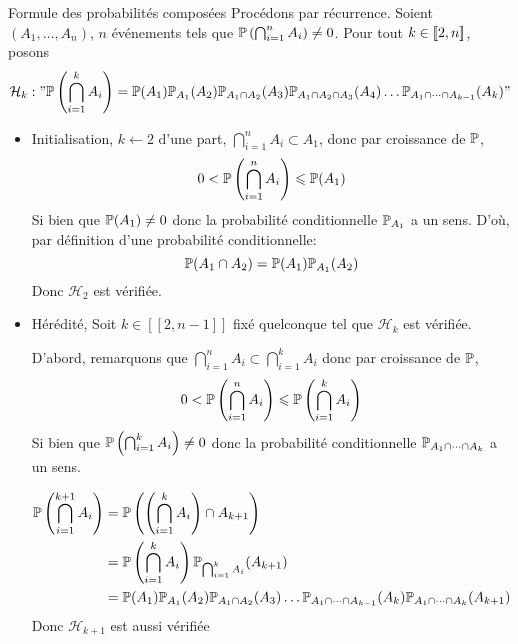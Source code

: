 \documentclass{article}
\begin{document}
\begin{question_kholle}[
	\begin{equation}
		\forall n \in \N^*, \
		\forall A \in \mathcal{P}(\Omega)^n, \
		\proba\left( \bigcap_{i=1}^{k}A_{i} \right) =
		\proba(A_{1}) \proba_{A_{1}}(A_{2}) \proba_{A_{1} \cap A_{2}}(A_{3}) \dots \proba_{A_{1} \cap \dots \cap A_{n-1}}(A_{n})
	\end{equation}
	]{Formule des probabilités composées}
	Procédons par récurrence.
	Soient $(A_{1}, \dots, A_{n})$, $n$ événements tels que $\mathbb P\left( \bigcap_{i=1}^{n} A_{i} \right) \neq 0$.
	Pour tout $k \in [\![ 2, n ]\!]$, posons 
	$$\mathcal{H}_{k} : " \mathbb P\left( \bigcap_{i=1}^{k}A_{i} \right) = \mathbb P(A_{1})\mathbb P_{A_{1}}(A_{2})\mathbb P_{A_{1} \cap A_{2}}(A_{3})\mathbb P_{A_{1} \cap A_{2} \cap A_{3}}(A_{4})\dots \mathbb P_{A_{1} \cap\dots \cap A_{k-1}}(A_{k})"$$
	
	\begin{itemize}[label=$\star$]

		\item Initialisation, $k \leftarrow 2$
		d'une part, $\bigcap_{i=1}^{n}A_{i} \subset A_{1}$, donc par croissance de $\mathbb P$, $$0<\mathbb P\left( \bigcap_{i=1}^{n}A_{i} \right) \leqslant \mathbb P(A_{1})$$
		Si bien que $\mathbb P(A_{1}) \neq 0$ donc la probabilité conditionnelle $\mathbb P_{A_{1}}$ a un sens.
		D'où, par définition d'une probabilité conditionnelle:
		$$\mathbb P(A_{1} \cap A_{2}) = \mathbb P(A_{1}) \mathbb P_{A_{1}}(A_{2})$$
		Donc $\mathcal{H}_{2}$ est vérifiée.
		
		\item Hérédité, Soit $k \in [ \! [ 2, n - 1] \!]$ fixé quelconque tel que $\mathcal{H}_{k}$ est vérifiée.
		
		D'abord, remarquons que $\bigcap_{i=1}^{n}A_{i} \subset \bigcap_{i=1}^{k}A_{i}$ donc par croissance de $\mathbb P$,
		$$0 < \mathbb P\left( \bigcap_{i=1}^{n}A_{i} \right)\leqslant \mathbb P\left( \bigcap_{i=1}^{k}A_{i} \right)$$
		Si bien que $\mathbb P\left( \bigcap_{i=1}^{k} A_{i} \right) \neq 0$ donc la probabilité conditionnelle $\mathbb P_{A_{1}\cap\dots \cap A_{k}}$  a un sens.
		
		
		\begin{align*}
			\mathbb P\left( \bigcap_{i=1}^{k+1}A_{i} \right) 
			&= \mathbb P\left( \left( \bigcap_{i=1}^{k}A_{i} \right) \cap A_{k+1} \right) \\
			&= \mathbb P\left( \bigcap_{i=1}^{k}A_{i} \right)\mathbb P_{\bigcap _{i=1}^{k}A_{i}}(A_{k+1}) \\
			&= \mathbb P(A_{1})\mathbb P_{A_{1}}(A_{2})\mathbb P_{A_{1}\cap A_{2}}(A_{3})\dots \mathbb P_{A_{1} \cap \dots \cap A_{k-1}}(A_{k}) \mathbb P_{A_{1} \cap \dots \cap A_{k}}(A_{k+1})
		\end{align*}
		Donc $\mathcal{H}_{k+1}$ est aussi vérifiée
	\end{itemize}
\end{question_kholle}
\end{document}
